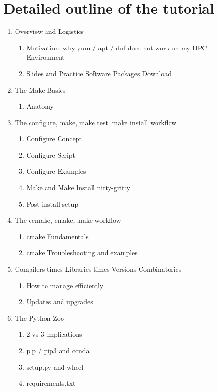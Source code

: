 \documentclass{report}
\begin{document}
\section*{Detailed outline of the tutorial}
\begin{enumerate}
\item Overview and Logistics
  \begin{enumerate}
    \item Motivation: why yum / apt / dnf does not work on my HPC Environment
    \item Slides and Practice Software Packages Download
  \end{enumerate}
\item The Make Basics
  \begin{enumerate}
    \item Anatomy
  \end{enumerate}
\item The configure, make, make test, make install workflow
  \begin{enumerate}
    \item Configure Concept
    \item Configure Script
    \item Configure Examples
    \item Make and Make Install nitty-gritty
    \item Post-install setup
  \end{enumerate}
\item The ccmake, cmake, make workflow
    \begin{enumerate}
      \item cmake Fundamentals
      \item cmake Troubleshooting and examples
    \end{enumerate}
\item Compilers times Libraries times Versions Combinatorics
  \begin{enumerate}
    \item How to manage efficiently
    \item Updates and upgrades
  \end{enumerate}
\item The Python Zoo
  \begin{enumerate}
    \item 2 vs 3 implications
    \item pip / pip3 and conda
    \item setup.py and wheel
    \item requirements.txt

\end{enumerate}
\end{enumerate}
\end{document}
